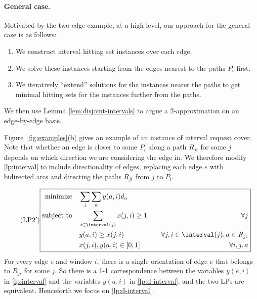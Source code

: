 \paragraph{General case.} 


Motivated by the two-edge example, at a high level, our approach for
the general case is as follows:
\begin{enumerate}
\item We construct interval hitting set instances over each edge.
\item We solve these instances starting from the edges nearest to the
  paths $P_i$ first.
\item We iteratively ``extend'' solutions for the instances nearer the
  paths to get minimal hitting sets for the instances further from
  the paths.
\end{enumerate}
We then use Lemma \ref{lem:disjoint-intervals} to argue a $2$-approximation
on an edge-by-edge basis.









Figure~\ref{fig:examples}(b) gives an example of an instance of
interval request cover. Note that whether an edge is closer to some
$P_i$ along a path $R_{ji}$ for some $j$ depends on which direction we
are considering the edge in. We therefore modify \eqref{lp:interval}
to include directionality of edges, replacing each edge $e$ with
bidirected arcs and directing the paths $R_{ji}$ from $j$ to $P_i$.



\begin{equation}
 \label{lp:d-interval}
 \tag{LP2$'$}
\boxed{
\begin{aligned}
  \mbox{minimize}\quad            
  & \sum_i \sum_a y(a,i)d_a\\
  \mbox{subject to}\quad  & \sum_{i \in \interval(j)} x(j, i) \geq 1 &\quad  \forall j\\
                      & y(a,i) \geq x(j,i) &\quad \forall j, i \in
                      \interval(j), a \in R_{ji}\\
                      & x(j, i), y(a,i) \in [0,1] &\quad \forall i, j,
                      a
\end{aligned}
}
\end{equation}
For every edge $e$ and window $i$, there is a single orientation of
edge $e$ that belongs to $R_{ji}$ for some $j$. So there is a 1-1
correspondence between the variables $y(e,i)$ in \eqref{lp:interval}
and the variables $y(a,i)$ in \eqref{lp:d-interval}, and the two LPs are
equivalent. Henceforth we focus on \eqref{lp:d-interval}.



